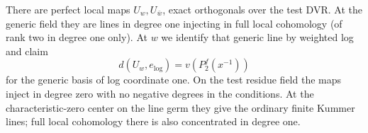 \begin{lemma}\label{real:local-log}
There are perfect local maps \(U_w,U_{\bar w}\), exact orthogonals
over the test DVR. At the generic field they are lines in degree one injecting in full local cohomology (of rank two in degree one only). At \(w\) we identify that generic line by weighted log and claim
\[
                     d(U_w,e_{\log})=v(P_2^f(x^{-1}))                 \tag{R4}\label{eq:R4}
\]
for the generic basis of log coordinate one. On the test residue field the maps inject in degree zero with no negative degrees in the conditions. At the characteristic-zero center on the line germ they give the
ordinary finite Kummer lines; full local cohomology there is also
concentrated in degree one.
\end{lemma}

